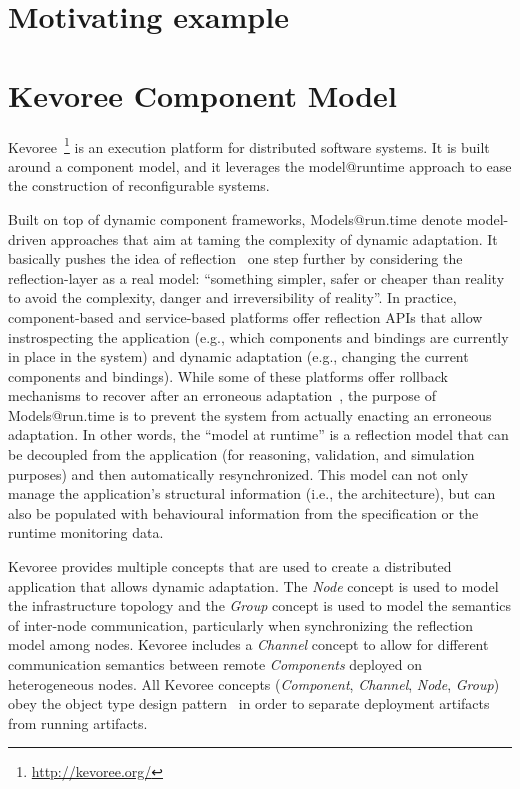 \section{Motivating example}\label{sec:scapegoat-motivaing-example}



\section{Kevoree Component Model}

Kevoree~\footnote{\url{http://kevoree.org/}} is an execution platform for distributed software systems.
It is built around a component model, and it leverages the model@runtime approach to ease the construction of reconfigurable systems.

Built on top of dynamic component frameworks, Models@run.time denote model-driven approaches that aim at taming the complexity of dynamic adaptation.
It basically pushes the idea of reflection~\cite{morin09a} one step further by considering the reflection-layer as a real model: ``something simpler, safer or cheaper than reality to avoid the complexity, danger and irreversibility of reality''.
In practice, component-based and service-based platforms offer reflection APIs that allow instrospecting the application (e.g., which components and bindings are currently in place in the system) and dynamic adaptation (e.g., changing the current components and bindings).
While some of these platforms offer rollback mechanisms to recover after an erroneous adaptation~\cite{leger2010reliable}, the purpose of Models@run.time is to prevent the system from actually enacting an erroneous adaptation. 
In other words, the ``model at runtime'' is a reflection model that can be decoupled from the application (for reasoning, validation, and simulation purposes) and then automatically resynchronized.
This model can not only manage the application's structural information (i.e., the architecture), but can also be populated with behavioural information from the specification or the runtime monitoring data.

Kevoree provides multiple concepts that are used to create a distributed application that allows dynamic adaptation. The \emph{Node} concept is used to model the infrastructure topology and the \emph{Group} concept is used to model the semantics of inter-node communication, particularly when synchronizing the reflection model among nodes. 
Kevoree includes a \emph{Channel} concept to allow for different communication semantics between remote \emph{Components} deployed on heterogeneous nodes. 
All Kevoree concepts (\textit{Component}, \textit{Channel}, \textit{Node}, \textit{Group}) obey the object type design pattern~\cite{johnson_type_1997} in order to separate deployment artifacts from running artifacts.  


